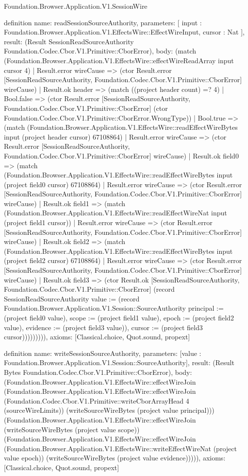 \begin{lexlean}{Foundation.Browser.Application.V1.SessionWire}
\begin{semanticmodule}
definition{
  name: readSessionSourceAuthority,
  parameters: [
    input : Foundation.Browser.Application.V1.EffectsWire::EffectWireInput,
    cursor : Nat
  ],
  result: (Result SessionReadSourceAuthority Foundation.Codec.Cbor.V1.Primitive::CborError),
  body: (match (Foundation.Browser.Application.V1.EffectsWire::effectWireReadArray input cursor 4)
    | Result.error wireCause => (ctor Result.error [SessionReadSourceAuthority, Foundation.Codec.Cbor.V1.Primitive::CborError] wireCause)
    | Result.ok header => (match ((project header count) =? 4)
      | Bool.false => (ctor Result.error [SessionReadSourceAuthority, Foundation.Codec.Cbor.V1.Primitive::CborError] (ctor Foundation.Codec.Cbor.V1.Primitive::CborError.WrongType))
      | Bool.true => (match (Foundation.Browser.Application.V1.EffectsWire::readEffectWireBytes input (project header cursor) 67108864)
        | Result.error wireCause => (ctor Result.error [SessionReadSourceAuthority, Foundation.Codec.Cbor.V1.Primitive::CborError] wireCause)
        | Result.ok field0 => (match (Foundation.Browser.Application.V1.EffectsWire::readEffectWireBytes input (project field0 cursor) 67108864)
          | Result.error wireCause => (ctor Result.error [SessionReadSourceAuthority, Foundation.Codec.Cbor.V1.Primitive::CborError] wireCause)
          | Result.ok field1 => (match (Foundation.Browser.Application.V1.EffectsWire::readEffectWireNat input (project field1 cursor))
            | Result.error wireCause => (ctor Result.error [SessionReadSourceAuthority, Foundation.Codec.Cbor.V1.Primitive::CborError] wireCause)
            | Result.ok field2 => (match (Foundation.Browser.Application.V1.EffectsWire::readEffectWireBytes input (project field2 cursor) 67108864)
              | Result.error wireCause => (ctor Result.error [SessionReadSourceAuthority, Foundation.Codec.Cbor.V1.Primitive::CborError] wireCause)
              | Result.ok field3 => (ctor Result.ok [SessionReadSourceAuthority, Foundation.Codec.Cbor.V1.Primitive::CborError] (record SessionReadSourceAuthority {value := (record Foundation.Browser.Application.V1.Session::SourceAuthority {principal := (project field0 value), scope := (project field1 value), epoch := (project field2 value), evidence := (project field3 value)}), cursor := (project field3 cursor)})))))))),
  axioms: [Classical.choice, Quot.sound, propext]
}

definition{
  name: writeSessionSourceAuthority,
  parameters: [value : Foundation.Browser.Application.V1.Session::SourceAuthority],
  result: (Result Bytes Foundation.Codec.Cbor.V1.Primitive::CborError),
  body: (Foundation.Browser.Application.V1.EffectsWire::effectWireJoin (Foundation.Browser.Application.V1.EffectsWire::effectWireJoin (Foundation.Codec.Cbor.V1.Primitive::writeCborArrayHead 4 (sourceWireLimits)) (writeSourceWireBytes (project value principal))) (Foundation.Browser.Application.V1.EffectsWire::effectWireJoin (writeSourceWireBytes (project value scope)) (Foundation.Browser.Application.V1.EffectsWire::effectWireJoin (Foundation.Browser.Application.V1.EffectsWire::writeEffectWireNat (project value epoch)) (writeSourceWireBytes (project value evidence))))),
  axioms: [Classical.choice, Quot.sound, propext]
}


\end{semanticmodule}
\end{lexlean}
